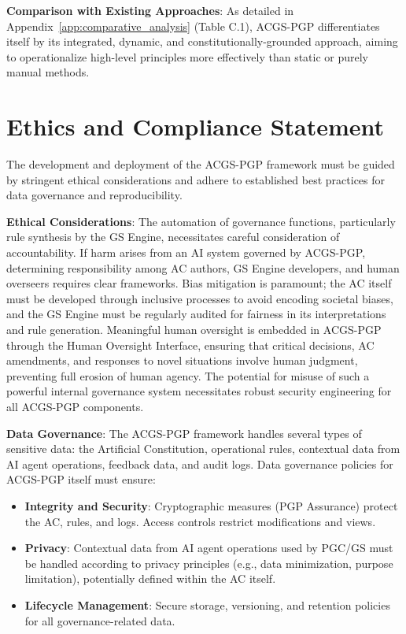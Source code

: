 \documentclass[sigconf,review,anonymous=false]{acmart} %
\begin{document}
\textbf{Comparison with Existing Approaches}: As detailed in Appendix~\ref{app:comparative_analysis} (Table C.1), ACGS-PGP differentiates itself by its integrated, dynamic, and constitutionally-grounded approach, aiming to operationalize high-level principles more effectively than static or purely manual methods.

\section{Ethics and Compliance Statement}
\label{sec:ethics_compliance_statement}
The development and deployment of the ACGS-PGP framework must be guided by stringent ethical considerations and adhere to established best practices for data governance and reproducibility.

\textbf{Ethical Considerations}: The automation of governance functions, particularly rule synthesis by the GS Engine, necessitates careful consideration of accountability. If harm arises from an AI system governed by ACGS-PGP, determining responsibility among AC authors, GS Engine developers, and human overseers requires clear frameworks. Bias mitigation is paramount; the AC itself must be developed through inclusive processes to avoid encoding societal biases, and the GS Engine must be regularly audited for fairness in its interpretations and rule generation. Meaningful human oversight is embedded in ACGS-PGP through the Human Oversight Interface, ensuring that critical decisions, AC amendments, and responses to novel situations involve human judgment, preventing full erosion of human agency. The potential for misuse of such a powerful internal governance system necessitates robust security engineering for all ACGS-PGP components.

\textbf{Data Governance}: The ACGS-PGP framework handles several types of sensitive data: the Artificial Constitution, operational rules, contextual data from AI agent operations, feedback data, and audit logs. Data governance policies for ACGS-PGP itself must ensure:
\begin{itemize}
    \item \textbf{Integrity and Security}: Cryptographic measures (PGP Assurance) protect the AC, rules, and logs. Access controls restrict modifications and views.
    \item \textbf{Privacy}: Contextual data from AI agent operations used by PGC/GS must be handled according to privacy principles (e.g., data minimization, purpose limitation), potentially defined within the AC itself.
    \item \textbf{Lifecycle Management}: Secure storage, versioning, and retention policies for all governance-related data.
\end{itemize}
\end{document}

